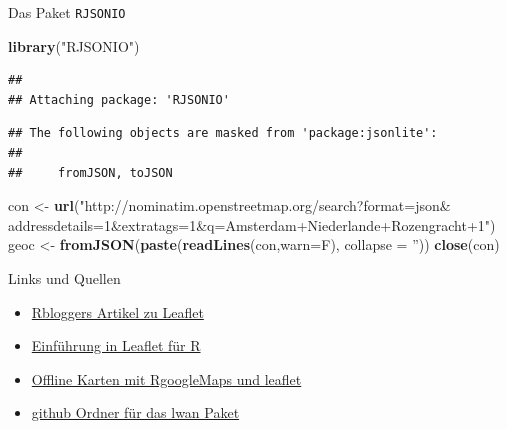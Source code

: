 \documentclass[ignorenonframetext,]{beamer}
\newenvironment{Shaded}{\begin{snugshade}}{\end{snugshade}}
\newcommand{\DataTypeTok}[1]{\textcolor[rgb]{0.13,0.29,0.53}{#1}}
\newcommand{\KeywordTok}[1]{\textcolor[rgb]{0.13,0.29,0.53}{\textbf{#1}}}
\newcommand{\NormalTok}[1]{#1}
\newcommand{\StringTok}[1]{\textcolor[rgb]{0.31,0.60,0.02}{#1}}
\begin{document}
\begin{frame}[fragile]{Das Paket \texttt{RJSONIO}}
\protect\hypertarget{das-paket-rjsonio}{}

\begin{Shaded}
\begin{Highlighting}[]
\KeywordTok{library}\NormalTok{(}\StringTok{"RJSONIO"}\NormalTok{)}
\end{Highlighting}
\end{Shaded}

\begin{verbatim}
## 
## Attaching package: 'RJSONIO'
\end{verbatim}

\begin{verbatim}
## The following objects are masked from 'package:jsonlite':
## 
##     fromJSON, toJSON
\end{verbatim}

\begin{Shaded}
\begin{Highlighting}[]
\NormalTok{con <-}\StringTok{ }\KeywordTok{url}\NormalTok{(}\StringTok{"http://nominatim.openstreetmap.org/search?format=json&}
\StringTok{addressdetails=1&extratags=1&q=Amsterdam+Niederlande+Rozengracht+1"}\NormalTok{)}
\NormalTok{geoc <-}\StringTok{ }\KeywordTok{fromJSON}\NormalTok{(}\KeywordTok{paste}\NormalTok{(}\KeywordTok{readLines}\NormalTok{(con,}\DataTypeTok{warn=}\NormalTok{F), }
                       \DataTypeTok{collapse =} \StringTok{''}\NormalTok{))}
\KeywordTok{close}\NormalTok{(con)}
\end{Highlighting}
\end{Shaded}

\end{frame}

\begin{frame}{Links und Quellen}
\protect\hypertarget{links-und-quellen}{}

\begin{itemize}
\item
  \href{http://www.r-bloggers.com/the-leaflet-package-for-online-mapping-in-r/}{Rbloggers
  Artikel zu Leaflet}
\item
  \href{https://rstudio.github.io/leaflet/}{Einführung in Leaflet für R}
\item
  \href{https://blog.hwr-berlin.de/codeandstats/category/scientific-software/r/}{Offline
  Karten mit RgoogleMaps und leaflet}
\item
  \href{https://github.com/ropensci/lawn}{github Ordner für das lwan
  Paket}
\end{itemize}

\end{frame}
\end{document}

